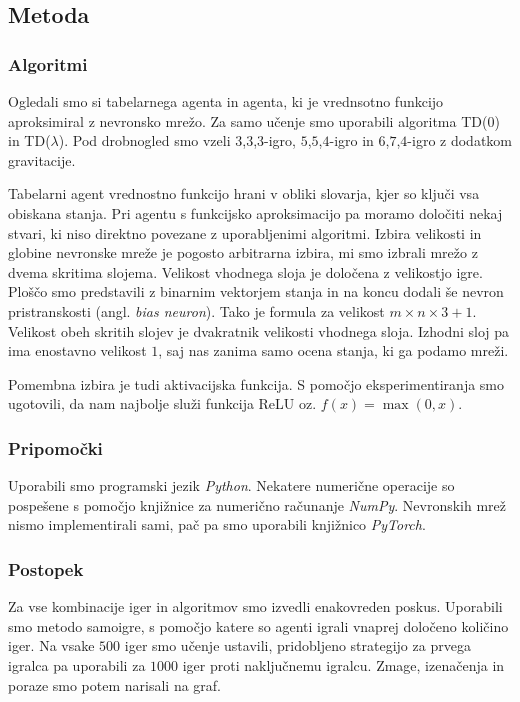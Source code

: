 \documentclass[12pt,a4paper]{amsart}
\theoremstyle{definition} %
\theoremstyle{plain} %
\begin{document}
\subsection{Metoda}

\subsubsection{Algoritmi}
Ogledali smo si tabelarnega agenta in agenta, ki je vrednsotno funkcijo aproksimiral z nevronsko mrežo. 
Za samo učenje smo uporabili algoritma TD($0$) in TD($\lambda$). Pod drobnogled smo vzeli $3$,$3$,$3$-igro,
$5$,$5$,$4$-igro in $6$,$7$,$4$-igro z dodatkom gravitacije.

Tabelarni agent vrednostno funkcijo hrani v obliki slovarja, kjer so ključi vsa obiskana stanja. 
Pri agentu s funkcijsko aproksimacijo pa moramo določiti nekaj stvari, ki niso direktno povezane z 
uporabljenimi algoritmi. Izbira velikosti in globine nevronske mreže je pogosto arbitrarna izbira, 
mi smo izbrali mrežo z dvema skritima slojema. Velikost vhodnega sloja je določena z velikostjo igre. 
Ploščo smo predstavili z binarnim vektorjem stanja in na koncu dodali še nevron pristranskosti (angl. 
\textit{bias neuron}). Tako je formula za velikost $ m \times n \times 3 + 1$. Velikost obeh skritih 
slojev je dvakratnik velikosti vhodnega sloja. Izhodni sloj pa ima enostavno velikost $1$, saj nas 
zanima samo ocena stanja, ki ga podamo mreži. 

Pomembna izbira je tudi aktivacijska funkcija. S pomočjo eksperimentiranja smo ugotovili, da nam 
najbolje služi funkcija ReLU oz. $f(x) = \max(0, x)$.

\subsubsection{Pripomočki}
Uporabili smo programski jezik \textit{Python}. Nekatere numerične operacije so pospešene s pomočjo 
knjižnice za numerično računanje \textit{NumPy}. Nevronskih mrež nismo implementirali sami, pač pa 
smo uporabili knjižnico \textit{PyTorch}.

\subsubsection{Postopek}
Za vse kombinacije iger in algoritmov smo izvedli enakovreden poskus. Uporabili smo metodo samoigre, 
s pomočjo katere so agenti igrali vnaprej določeno količino iger. Na vsake $500$ iger smo učenje 
ustavili, pridobljeno strategijo za prvega igralca pa uporabili za $1000$ iger proti naključnemu 
igralcu. Zmage, izenačenja in poraze smo potem narisali na graf. 
\end{document}
